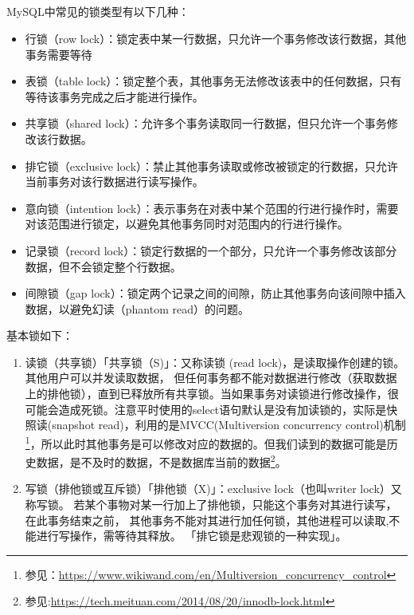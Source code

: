 \documentclass[../../../interview-questions.tex]{subfiles}
\begin{document}
\subsection{\color{red}{MySQL的锁类型}}

MySQL中常见的锁类型有以下几种：

\begin{itemize}
    \item {行锁（row lock）：锁定表中某一行数据，只允许一个事务修改该行数据，其他事务需要等待}
    \item {表锁（table lock）：锁定整个表，其他事务无法修改该表中的任何数据，只有等待该事务完成之后才能进行操作。}
    \item {共享锁（shared lock）：允许多个事务读取同一行数据，但只允许一个事务修改该行数据。}
    \item {排它锁（exclusive lock）：禁止其他事务读取或修改被锁定的行数据，只允许当前事务对该行数据进行读写操作。}
    \item {意向锁（intention lock）：表示事务在对表中某个范围的行进行操作时，需要对该范围进行锁定，以避免其他事务同时对范围内的行进行操作。}
    \item {记录锁（record lock）：锁定行数据的一个部分，只允许一个事务修改该部分数据，但不会锁定整个行数据。}
    \item {间隙锁（gap lock）：锁定两个记录之间的间隙，防止其他事务向该间隙中插入数据，以避免幻读（phantom read）的问题。}
\end{itemize}



基本锁如下：

\begin{enumerate}
    \item{读锁（共享锁）}「共享锁（S)」：又称读锁 (read lock)，是读取操作创建的锁。其他用户可以并发读取数据， 但任何事务都不能对数据进行修改（获取数据上的排他锁），直到已释放所有共享锁。当如果事务对读锁进行修改操作，很可能会造成死锁。注意平时使用的select语句默认是没有加读锁的，实际是快照读(snapshot read)，利用的是MVCC(Multiversion concurrency control)机制\footnote{参见：\url{https://www.wikiwand.com/en/Multiversion_concurrency_control}}，所以此时其他事务是可以修改对应的数据的。但我们读到的数据可能是历史数据，是不及时的数据，不是数据库当前的数据\footnote{参见:\url{https://tech.meituan.com/2014/08/20/innodb-lock.html}}。
    \item{写锁（排他锁或互斥锁）}「排他锁（X)」：exclusive lock（也叫writer lock）又称写锁。 若某个事物对某一行加上了排他锁，只能这个事务对其进行读写，在此事务结束之前， 其他事务不能对其进行加任何锁，其他进程可以读取,不能进行写操作，需等待其释放。 「排它锁是悲观锁的一种实现」。
\end{enumerate}
\end{document}
